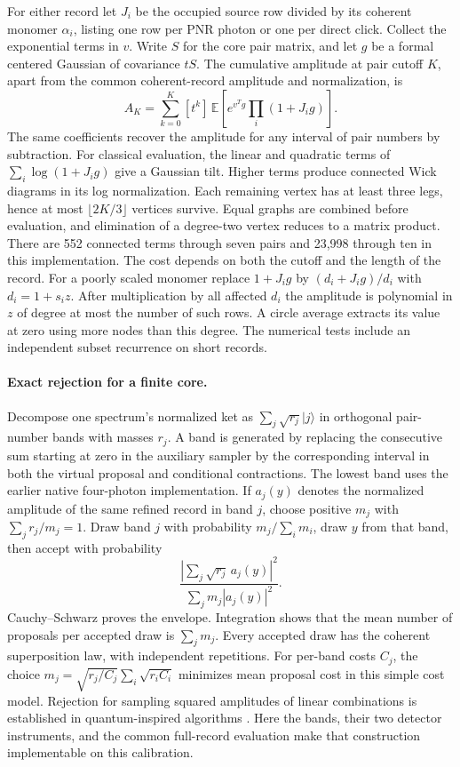 \documentclass[11pt]{article}
\newcommand{\E}{\mathbb{E}}
\begin{document}
For either record let $J_i$ be the occupied source row divided by its coherent monomer $\alpha_i$, listing one row per PNR photon or one per direct click. Collect the exponential terms in $v$. Write $S$ for the core pair matrix, and let $g$ be a formal centered Gaussian of covariance $tS$. The cumulative amplitude at pair cutoff $K$, apart from the common coherent-record amplitude and normalization, is
\[
 A_K=\sum_{k=0}^K[t^k]\,\E\left[e^{v^T g}\prod_i(1+J_i g)\right].
\]
The same coefficients recover the amplitude for any interval of pair numbers by subtraction. For classical evaluation, the linear and quadratic terms of $\sum_i\log(1+J_i g)$ give a Gaussian tilt. Higher terms produce connected Wick diagrams in its log normalization. Each remaining vertex has at least three legs, hence at most $\lfloor 2K/3\rfloor$ vertices survive. Equal graphs are combined before evaluation, and elimination of a degree-two vertex reduces to a matrix product. There are 552 connected terms through seven pairs and 23,998 through ten in this implementation. The cost depends on both the cutoff and the length of the record. For a poorly scaled monomer replace $1+J_i g$ by $(d_i+J_i g)/d_i$ with $d_i=1+s_i z$. After multiplication by all affected $d_i$ the amplitude is polynomial in $z$ of degree at most the number of such rows. A circle average extracts its value at zero using more nodes than this degree. The numerical tests include an independent subset recurrence on short records.

\paragraph{Exact rejection for a finite core.}
Decompose one spectrum's normalized ket as $\sum_j\sqrt{r_j}|j\rangle$ in orthogonal pair-number bands with masses $r_j$. A band is generated by replacing the consecutive sum starting at zero in the auxiliary sampler by the corresponding interval in both the virtual proposal and conditional contractions. The lowest band uses the earlier native four-photon implementation. If $a_j(y)$ denotes the normalized amplitude of the same refined record in band $j$, choose positive $m_j$ with $\sum_j r_j/m_j=1$. Draw band $j$ with probability $m_j/\sum_i m_i$, draw $y$ from that band, then accept with probability
\[
 \frac{|\sum_j\sqrt{r_j}\,a_j(y)|^2}{\sum_j m_j |a_j(y)|^2}.
\]
Cauchy--Schwarz proves the envelope. Integration shows that the mean number of proposals per accepted draw is $\sum_j m_j$. Every accepted draw has the coherent superposition law, with independent repetitions. For per-band costs $C_j$, the choice $m_j=\sqrt{r_j/C_j}\sum_i\sqrt{r_i C_i}$ minimizes mean proposal cost in this simple cost model. Rejection for sampling squared amplitudes of linear combinations is established in quantum-inspired algorithms \cite{tang}. Here the bands, their two detector instruments, and the common full-record evaluation make that construction implementable on this calibration.
\end{document}

